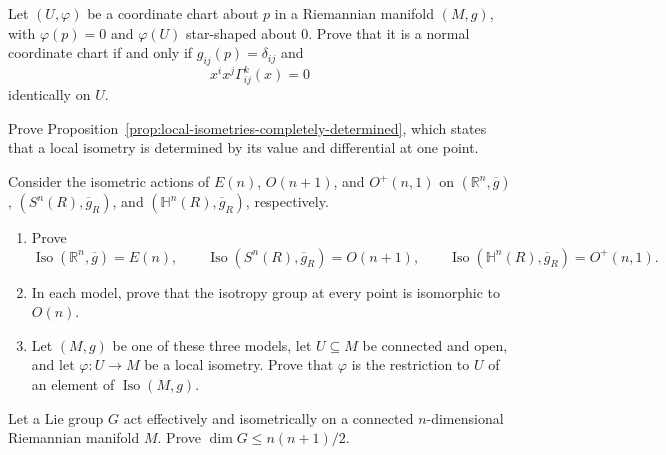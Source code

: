 \begin{exercise}
\label{prob:normal-coordinates-chart}

Let $(U,\varphi)$ be a coordinate chart about $p$ in a Riemannian manifold
$(M,g)$, with $\varphi(p)=0$ and $\varphi(U)$ star-shaped about $0$. Prove
that it is a normal coordinate chart if and only if
$g_{ij}(p)=\delta_{ij}$ and
\[
x^ix^j\Gamma^k_{ij}(x)=0
\]
identically on $U$.
\end{exercise}

\begin{exercise}
\label{prob:local-isometry-determined-point}

Prove Proposition~\ref{prop:local-isometries-completely-determined}, which
states that a local isometry is determined by its value and differential at
one point.
\end{exercise}

\begin{exercise}
\label{prob:model-manifolds-isometric-actions}

Consider the isometric actions of $E(n)$, $O(n+1)$, and $O^+(n,1)$ on
$(\mathbb R^n,\overline g)$, $(S^n(R),\overline g_R)$, and
$(\mathbb H^n(R),\overline g_R)$, respectively.
\begin{enumerate}
\item[(a)] Prove
\[
\operatorname{Iso}(\mathbb R^n,\overline g)=E(n),\qquad
\operatorname{Iso}(S^n(R),\overline g_R)=O(n+1),\qquad
\operatorname{Iso}(\mathbb H^n(R),\overline g_R)=O^+(n,1).
\]
\item[(b)] In each model, prove that the isotropy group at every point is
isomorphic to $O(n)$.
\item[(c)] Let $(M,g)$ be one of these three models, let $U\subseteq M$ be
connected and open, and let $\varphi:U\to M$ be a local isometry. Prove that
$\varphi$ is the restriction to $U$ of an element of
$\operatorname{Iso}(M,g)$.
\end{enumerate}
\end{exercise}

\begin{exercise}
\label{prob:lie-group-dimension-bound}

Let a Lie group $G$ act effectively and isometrically on a connected
$n$-dimensional Riemannian manifold $M$. Prove
$\dim G\leq n(n+1)/2$.
\end{exercise}

